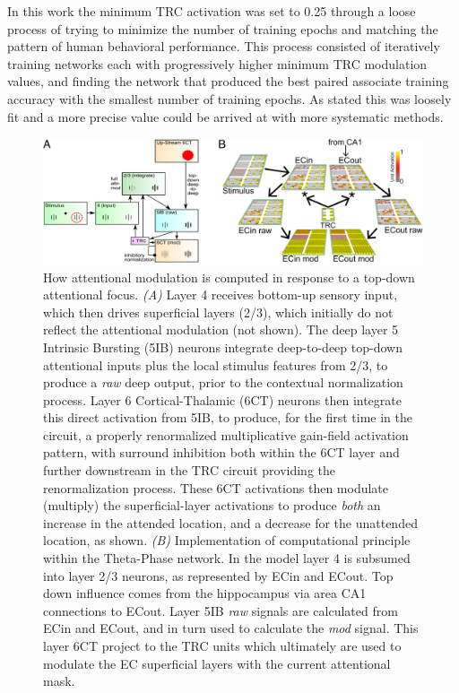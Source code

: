 \documentclass[11pt, titlepage, twoside]{article}
\begin{document}
In this work the minimum TRC activation was set to 0.25 through a loose process of trying to minimize the number of training epochs and matching the pattern of human behavioral performance.  This process consisted of iteratively training networks each with progressively higher minimum TRC modulation values, and finding the network that produced the best paired associate training accuracy with the smallest number of training epochs.   As stated this was loosely fit and a more precise value could be arrived at with more systematic methods. 


\begin{figure}
  \centering\includegraphics[width=1\textwidth]{figs/fig_deepleabra_attn_compute_edit.pdf}
  \caption[Signal Flow Through Cortical Layers in Deep LEABRA]{\small How attentional modulation is computed in response to a top-down attentional focus.  \emph{(A)} Layer 4 receives bottom-up sensory input, which then drives superficial layers (2/3), which initially do not reflect the attentional modulation (not shown).  The deep layer 5 Intrinsic Bursting (5IB) neurons integrate deep-to-deep top-down attentional inputs plus the local stimulus features from 2/3, to produce a {\em raw} deep output, prior to the contextual normalization process.  Layer 6 Cortical-Thalamic (6CT) neurons then integrate this direct activation from 5IB, to produce, for the first time in the circuit, a properly renormalized multiplicative gain-field activation pattern, with surround inhibition both within the 6CT layer and further downstream in the  TRC circuit providing the renormalization process.  These 6CT activations then modulate (multiply) the superficial-layer activations to produce {\em both} an increase in the attended location, and a decrease for the unattended location, as shown.  
\emph{(B)} Implementation of computational principle within the Theta-Phase network.  In the model layer 4 is subsumed into layer 2/3 neurons, as represented by ECin and ECout.  Top down influence comes from the hippocampus via area CA1 connections to ECout.  Layer 5IB \emph{raw} signals are calculated from ECin and ECout, and in turn used to calculate the \emph{mod} signal.  This layer 6CT project to the TRC units which ultimately are used to modulate the EC superficial layers with the current attentional mask. 
  }
  \label{fig:attn_compute}
\end{figure}
\end{document}
